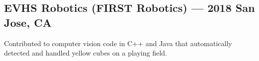 \documentclass[../Resume.tex]{subfiles}
\begin{document}
	\subsection{EVHS Robotics (FIRST Robotics) --- 2018 \null\hfill San Jose, CA}
	\par Contributed to computer vision code in C++ and Java that automatically detected and handled yellow cubes on a playing field.
	\vspace*{-2mm}
\end{document}
